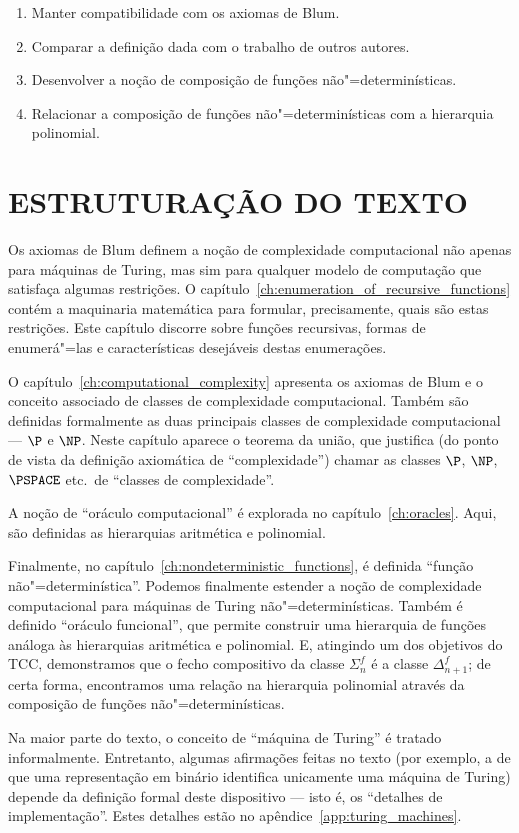 \begin{enumerate}
    \item Manter compatibilidade com os axiomas de Blum.
    \item Comparar a definição dada com o trabalho de outros autores.
    \item Desenvolver a noção de composição de funções não"=determinísticas.
    \item Relacionar a composição de funções não"=determinísticas
        com a hierarquia polinomial.
\end{enumerate}

\section{ESTRUTURAÇÃO DO TEXTO}

Os axiomas de Blum definem a noção de complexidade computacional
não apenas para máquinas de Turing,
mas sim para qualquer modelo de computação que satisfaça algumas restrições.
O capítulo~\ref{ch:enumeration_of_recursive_functions}
contém a maquinaria matemática para formular,
precisamente,
quais são estas restrições.
Este capítulo discorre sobre funções recursivas,
formas de enumerá"=las
e características desejáveis destas enumerações.

O capítulo~\ref{ch:computational_complexity}
apresenta os axiomas de Blum
e o conceito associado de classes de complexidade computacional.
Também são definidas formalmente
as duas principais classes de complexidade computacional
--- $\P$ e $\NP$.
Neste capítulo aparece o teorema da união,
que justifica
(do ponto de vista da definição axiomática de ``complexidade'')
chamar as classes $\P$, $\NP$, $\PSPACE$ etc.\ de ``classes de complexidade''.

A noção de ``oráculo computacional'' é explorada no capítulo~\ref{ch:oracles}.
Aqui,
são definidas as hierarquias aritmética e polinomial.

Finalmente,
no capítulo~\ref{ch:nondeterministic_functions},
é definida ``função não"=determinística''.
Podemos finalmente estender a noção de complexidade computacional
para máquinas de Turing não"=determinísticas.
Também é definido ``oráculo funcional'',
que permite construir uma hierarquia de funções
análoga às hierarquias aritmética e polinomial.
E, atingindo um dos objetivos do TCC,
demonstramos que o fecho compositivo da classe $\Sigma_n^f$
é a classe $\Delta_{n+1}^f$;
de certa forma,
encontramos uma relação na hierarquia polinomial
através da composição de funções não"=determinísticas.

Na maior parte do texto,
o conceito de ``máquina de Turing'' é tratado informalmente.
Entretanto,
algumas afirmações feitas no texto
(por exemplo, a de que uma representação em binário
identifica unicamente uma máquina de Turing)
depende da definição formal deste dispositivo
--- isto é, os ``detalhes de implementação''.
Estes detalhes estão no apêndice~\ref{app:turing_machines}.
